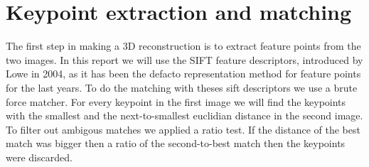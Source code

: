 \section{Keypoint extraction and matching}
\label{matching}
The first step in making a 3D reconstruction is to extract feature points from the two images.
In this report we will use the SIFT feature descriptors, introduced by Lowe\cite{SIFT} in 2004, as it has been the defacto representation method for feature points for the last years.
To do the matching with theses sift descriptors we use a brute force matcher. 
For every keypoint in the first image we will find the keypoints with the smallest and the next-to-smallest euclidian distance in the second image. 
To filter out ambigous matches we applied a ratio test. If the distance of the best match was bigger then a ratio of the second-to-best match then the keypoints were discarded.
